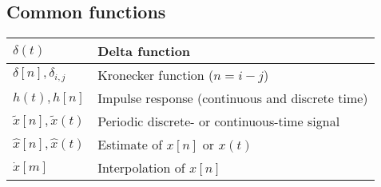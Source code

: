 \documentclass{article}
\begin{document}
\subsection{Common functions}
\begin{xltabular}{\textwidth}{XX}
    \(\delta(t)\) & Delta function\\ \hline
    \(\delta[n], \delta_{i,j}\) & Kronecker function (\(n = i-j\))\\ \hline
    \(h(t), h[n]\) & Impulse response (continuous and discrete time)\\ \hline
    \(\tilde{x}[n], \tilde{x}(t)\) & Periodic discrete- or continuous-time signal\\ \hline
    \(\hat{x}[n], \hat{x}(t)\) & Estimate of \(x[n]\) or \(x(t)\)\\ \hline
    \(\dot{x}[m]\) & Interpolation of \(x[n]\)\\
\end{xltabular}
\end{document}
